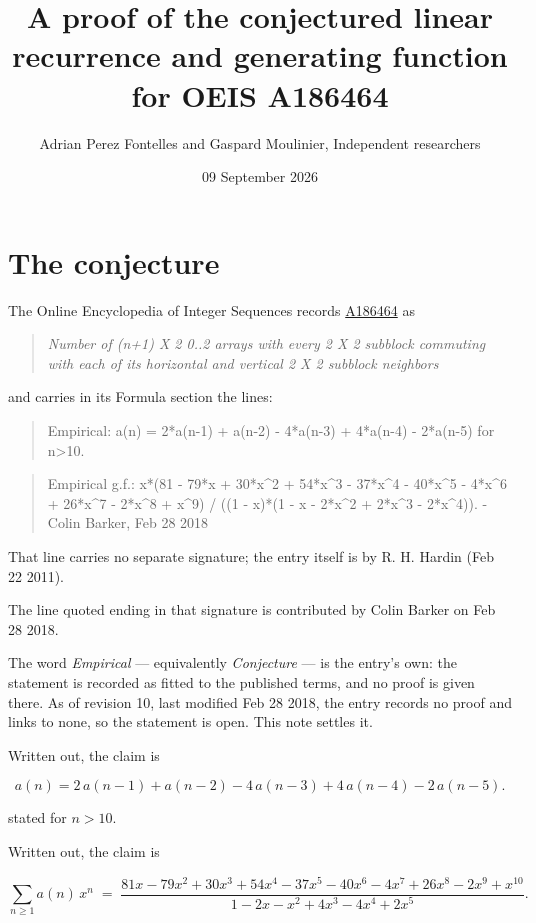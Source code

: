 \documentclass[11pt]{article}
\title{A proof of the conjectured linear recurrence and generating function for OEIS A186464}
\author{Adrian Perez Fontelles and Gaspard Moulinier, Independent researchers}
\date{09 September 2026}
\theoremstyle{definition}
\begin{document}
\maketitle
\section{The conjecture}

The Online Encyclopedia of Integer Sequences records \href{https://oeis.org/A186464}{A186464} as

\begin{quote}\itshape Number of (n+1) X 2 0..2 arrays with every 2 X 2 subblock commuting with each of its horizontal and vertical 2 X 2 subblock neighbors\end{quote}

and carries in its Formula section the lines:

\begin{quote}\ttfamily Empirical: a(n) = 2*a(n-1) + a(n-2) - 4*a(n-3) + 4*a(n-4) - 2*a(n-5) for n>10.\end{quote}

\begin{quote}\ttfamily Empirical g.f.: x*(81 - 79*x + 30*x\textasciicircum{}2 + 54*x\textasciicircum{}3 - 37*x\textasciicircum{}4 - 40*x\textasciicircum{}5 - 4*x\textasciicircum{}6 + 26*x\textasciicircum{}7 - 2*x\textasciicircum{}8 + x\textasciicircum{}9) / ((1 - x)*(1 - x - 2*x\textasciicircum{}2 + 2*x\textasciicircum{}3 - 2*x\textasciicircum{}4)). - Colin Barker, Feb 28 2018\end{quote}

That line carries no separate signature; the entry itself is by R. H. Hardin (Feb 22 2011).

The line quoted ending in that signature is contributed by Colin Barker on Feb 28 2018.

The word {\itshape Empirical} --- equivalently {\itshape Conjecture} --- is the entry's own: the statement is recorded as fitted to the published terms, and no proof is given there. As of revision 10, last modified Feb 28 2018, the entry records no proof and links to none, so the statement is open. This note settles it.

Written out, the claim is

\[a(n) = 2\,a(n-1) + a(n-2) - 4\,a(n-3) + 4\,a(n-4) - 2\,a(n-5).\]

stated for $n > 10$.

Written out, the claim is

\[\sum_{n \ge 1} a(n)\,x^n \;=\; \frac{81x - 79x^{2} + 30x^{3} + 54x^{4} - 37x^{5} - 40x^{6} - 4x^{7} + 26x^{8} - 2x^{9} + x^{10}}{1 - 2x - x^{2} + 4x^{3} - 4x^{4} + 2x^{5}}.\]
\end{document}
